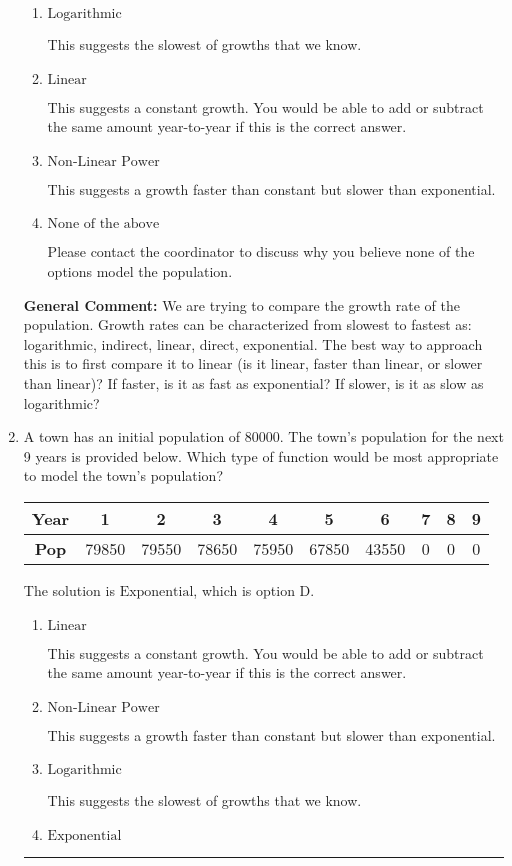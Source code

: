 \documentclass{extbook}[14pt]
\newcommand{\litem}[1]{\item #1

\rule{\textwidth}{0.4pt}}
\begin{document}
\begin{enumerate}
{\begin{enumerate}[label=\Alph*.]
This suggests the fastest of growths that we know.
\item \( \text{Logarithmic} \)

This suggests the slowest of growths that we know.
\item \( \text{Linear} \)

This suggests a constant growth. You would be able to add or subtract the same amount year-to-year if this is the correct answer.
\item \( \text{Non-Linear Power} \)

This suggests a growth faster than constant but slower than exponential.
\item \( \text{None of the above} \)

Please contact the coordinator to discuss why you believe none of the options model the population.
\end{enumerate}

\textbf{General Comment:} We are trying to compare the growth rate of the population. Growth rates can be characterized from slowest to fastest as: logarithmic, indirect, linear, direct, exponential. The best way to approach this is to first compare it to linear (is it linear, faster than linear, or slower than linear)? If faster, is it as fast as exponential? If slower, is it as slow as logarithmic?
}
\litem{
A town has an initial population of 80000. The town's population for the next 9 years is provided below. Which type of function would be most appropriate to model the town's population?


\begin{tabular}{c|c|c|c|c|c|c|c|c|c}
\textbf{Year} &1 &2 &3 &4 &5 &6 &7 &8 &9\tabularnewline \hline
\textbf{Pop} &79850 &79550 &78650 &75950 &67850 &43550 &0 &0 &0\end{tabular}The solution is \( \text{Exponential} \), which is option D.\begin{enumerate}[label=\Alph*.]
\item \( \text{Linear} \)

This suggests a constant growth. You would be able to add or subtract the same amount year-to-year if this is the correct answer.
\item \( \text{Non-Linear Power} \)

This suggests a growth faster than constant but slower than exponential.
\item \( \text{Logarithmic} \)

This suggests the slowest of growths that we know.
\item \( \text{Exponential} \)


\end{enumerate}}
\end{enumerate}
\end{document}
